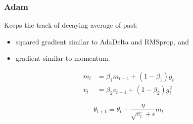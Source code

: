 \documentclass{beamer}
\begin{document}
\begin{frame}
    \frametitle{Adam}
    

    
    Keeps the track of decaying average of past:
    \begin{itemize}
        \item squared gradient similar to AdaDelta and RMSprop, and
        \item gradient similar to momentum.
    \end{itemize}
    
    \begin{equation}
\begin{aligned} m_{t} &=\beta_{1} m_{t-1}+\left(1-\beta_{1}\right) g_{t} \\ v_{t} &=\beta_{2} v_{t-1}+\left(1-\beta_{2}\right) g_{t}^{2} \end{aligned}
\end{equation}

\begin{equation}
\theta_{t+1}=\theta_{t}-\frac{\eta}{\sqrt{v_{t}}+\epsilon} m_{t}
\end{equation}
    
\end{frame}
\end{document}
